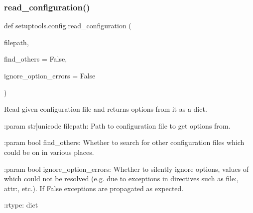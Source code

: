 \subsubsection{\texorpdfstring{read\+\_\+configuration()}{read\_configuration()}}
{\footnotesize\ttfamily def setuptools.\+config.\+read\+\_\+configuration (\begin{DoxyParamCaption}\item[{}]{filepath,  }\item[{}]{find\+\_\+others = {\ttfamily False},  }\item[{}]{ignore\+\_\+option\+\_\+errors = {\ttfamily False} }\end{DoxyParamCaption})}

\begin{DoxyVerb}Read given configuration file and returns options from it as a dict.

:param str|unicode filepath: Path to configuration file
    to get options from.

:param bool find_others: Whether to search for other configuration files
    which could be on in various places.

:param bool ignore_option_errors: Whether to silently ignore
    options, values of which could not be resolved (e.g. due to exceptions
    in directives such as file:, attr:, etc.).
    If False exceptions are propagated as expected.

:rtype: dict
\end{DoxyVerb}
 